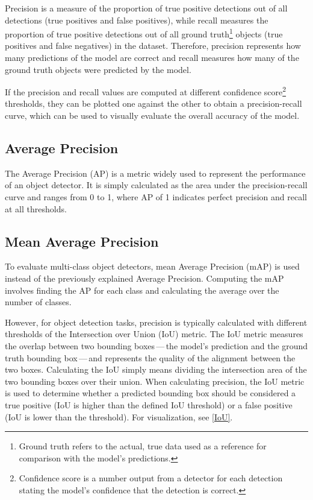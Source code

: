 Precision is a measure of the proportion of true positive detections out of all
detections (true positives and false positives), while recall measures the
proportion of true positive detections out of all ground truth\footnote{Ground
truth refers to the actual, true data used as a reference for comparison with
the model's predictions.} objects (true positives and false negatives) in the
dataset. Therefore, precision represents how many predictions of the model are
correct and recall measures how many of the ground truth objects were predicted
by the model.

If the precision and recall values are computed at different confidence
score\footnote{Confidence score is a number output from a detector for each
detection stating the model's confidence that the detection is correct.}
thresholds, they can be plotted one against the other to obtain a
precision-recall curve, which can be used to visually evaluate the overall
accuracy of the model.

\subsection*{Average Precision}

The Average Precision (AP) is a metric widely used to represent the performance
of an object detector. It is simply calculated as the area under the
precision-recall curve and ranges from 0 to 1, where AP of 1 indicates perfect
precision and recall at all thresholds.

\subsection*{Mean Average Precision}

To evaluate multi-class object detectors, mean Average Precision (mAP) is used
instead of the previously explained Average Precision. Computing the mAP
involves finding the AP for each class and calculating the average over the
number of classes.

However, for object detection tasks, precision is typically calculated with
different thresholds of the Intersection over Union (IoU) metric. The IoU metric
measures the overlap between two bounding boxes\,---\,the model's
prediction and the ground truth bounding box\,---\,and represents the quality of the
alignment between the two boxes. Calculating the IoU simply means dividing the
intersection area of the two bounding boxes over their union. When calculating
precision, the IoU metric is used to determine whether a predicted bounding box
should be considered a true positive (IoU is higher than the defined IoU
threshold) or a false positive (IoU is lower than the threshold). For
visualization, see \autoref{IoU}.

